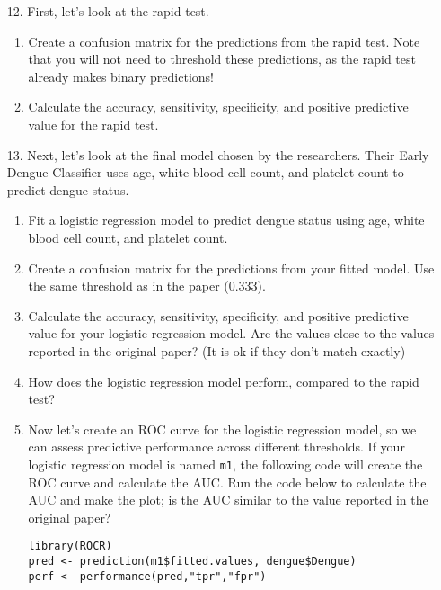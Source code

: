 \documentclass[11pt]{article}
\begin{document}
\begin{enumerate}
\item[12.] First, let's look at the rapid test. 

\begin{enumerate}
\item Create a confusion matrix for the predictions from the rapid test. Note that you will not need to threshold these predictions, as the rapid test already makes binary predictions!

\item Calculate the accuracy, sensitivity, specificity, and positive predictive value for the rapid test.
\end{enumerate}

\item[13.] Next, let's look at the final model chosen by the researchers. Their Early Dengue Classifier uses age, white blood cell count, and platelet count to predict dengue status. 

\begin{enumerate}
\item Fit a logistic regression model to predict dengue status using age, white blood cell count, and platelet count.

\item Create a confusion matrix for the predictions from your fitted model. Use the same threshold as in the paper (0.333).

\item Calculate the accuracy, sensitivity, specificity, and positive predictive value for your logistic regression model. Are the values close to the values reported in the original paper? (It is ok if they don't match exactly)

\item How does the logistic regression model perform, compared to the rapid test?

\item Now let's create an ROC curve for the logistic regression model, so we can assess predictive performance across different thresholds. If your logistic regression model is named \verb;m1;, the following code will create the ROC curve and calculate the AUC. Run the code below to calculate the AUC and make the plot; is the AUC similar to the value reported in the original paper?

\begin{verbatim}
library(ROCR)
pred <- prediction(m1$fitted.values, dengue$Dengue)
perf <- performance(pred,"tpr","fpr")


\end{verbatim}
\end{enumerate}
\end{enumerate}
\end{document}
